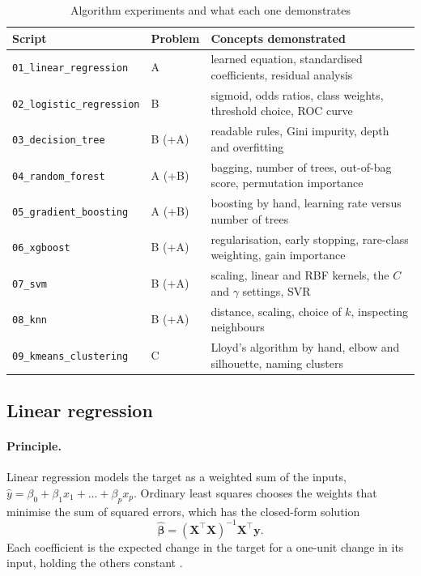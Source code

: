 \begin{table}[htbp]\centering\small
\caption{Algorithm experiments and what each one demonstrates}\label{tab:lessons}
\begin{tabularx}{\linewidth}{@{}llX@{}}
\toprule
\textbf{Script} & \textbf{Problem} & \textbf{Concepts demonstrated} \\ \midrule
\texttt{01\_linear\_regression} & A & learned equation, standardised coefficients, residual analysis \\
\texttt{02\_logistic\_regression} & B & sigmoid, odds ratios, class weights, threshold choice, ROC curve \\
\texttt{03\_decision\_tree} & B (+A) & readable rules, Gini impurity, depth and overfitting \\
\texttt{04\_random\_forest} & A (+B) & bagging, number of trees, out-of-bag score, permutation importance \\
\texttt{05\_gradient\_boosting} & A (+B) & boosting by hand, learning rate versus number of trees \\
\texttt{06\_xgboost} & B (+A) & regularisation, early stopping, rare-class weighting, gain importance \\
\texttt{07\_svm} & B (+A) & scaling, linear and RBF kernels, the $C$ and $\gamma$ settings, SVR \\
\texttt{08\_knn} & B (+A) & distance, scaling, choice of $k$, inspecting neighbours \\
\texttt{09\_kmeans\_clustering} & C & Lloyd's algorithm by hand, elbow and silhouette, naming clusters \\ \bottomrule
\end{tabularx}
\end{table}

\subsection{Linear regression}
\paragraph{Principle.} Linear regression models the target as a weighted sum of the inputs,
$\hat y = \beta_0 + \beta_1 x_1 + \dots + \beta_p x_p$. Ordinary least squares chooses the weights that minimise
the sum of squared errors, which has the closed-form solution
\[
  \hat{\boldsymbol\beta} = (\mathbf X^\top \mathbf X)^{-1}\mathbf X^\top \mathbf y .
\]
Each coefficient is the expected change in the target for a one-unit change in its input, holding the others
constant \citep{montgomery2021, james2021}.

